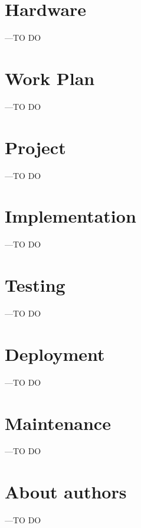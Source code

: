 \documentclass[a4paper]{article}
\begin{document}
\section{Hardware}
---TO DO
\section{Work Plan}
---TO DO

\section{Project}
---TO DO

\section{Implementation}
---TO DO
\section{Testing}
---TO DO
\section{Deployment}
---TO DO

\section{Maintenance}
---TO DO

\section{About authors}
---TO DO


\end{document}
